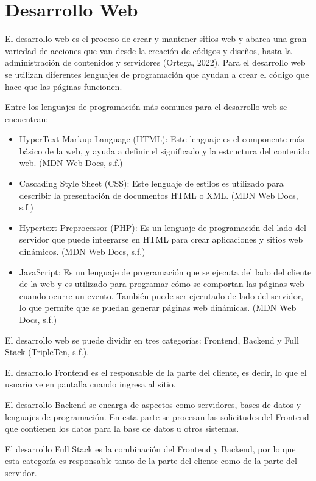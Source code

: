 \section{Desarrollo Web}
El desarrollo web es el proceso de crear y mantener sitios web y abarca una gran variedad de acciones que van desde la creación de códigos y diseños, hasta la administración de contenidos y servidores (Ortega, 2022). Para el desarrollo web se utilizan diferentes lenguajes de programación que ayudan a crear el código que hace que las páginas funcionen.

Entre los lenguajes de programación más comunes para el desarrollo web se encuentran:
    \begin{itemize}
        \item HyperText Markup Language (HTML): Este lenguaje es el componente más básico de la web, y ayuda a definir el significado y la estructura del   contenido web. (MDN Web Docs, s.f.)
        \item Cascading Style Sheet (CSS): Este lenguaje de estilos es utilizado para describir la presentación de documentos HTML o XML. (MDN Web Docs, s.f.)
        \item Hypertext Preprocessor (PHP): Es un lenguaje de programación del lado del servidor que puede integrarse en HTML para crear aplicaciones y sitios web dinámicos. (MDN Web Docs, s.f.)
        \item JavaScript: Es un lenguaje de programación que se ejecuta del lado del cliente de la web y es utilizado para programar cómo se comportan las páginas web cuando ocurre un evento. También puede ser ejecutado de lado del servidor, lo que permite que se puedan generar páginas web dinámicas. (MDN Web Docs, s.f.)
    \end{itemize}
El desarrollo web se puede dividir en tres categorías: Frontend, Backend y Full Stack (TripleTen, s.f.).

El desarrollo Frontend es el responsable de la parte del cliente, es decir, lo que el usuario ve en pantalla cuando ingresa al sitio.

El desarrollo Backend se encarga de aspectos como servidores, bases de datos y lenguajes de programación. En esta parte se procesan las solicitudes del Frontend que contienen los datos para la base de datos u otros sistemas.

El desarrollo Full Stack es la combinación del Frontend y Backend, por lo que esta categoría es responsable tanto de la parte del cliente como de la parte del servidor.

